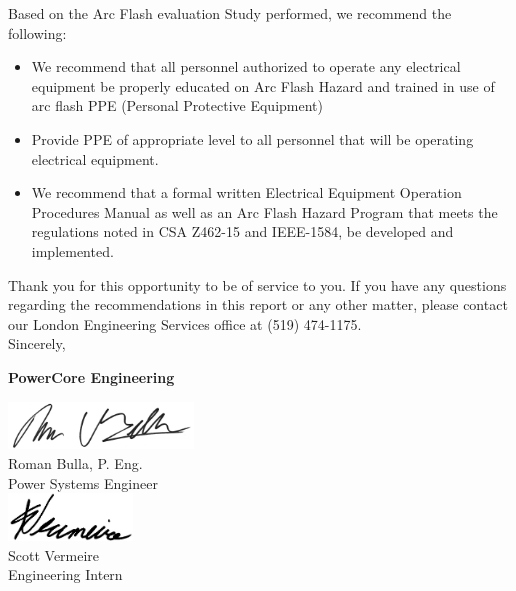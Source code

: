 Based on the Arc Flash evaluation Study performed, we recommend the following:
\begin{itemize}
\item We recommend that all personnel authorized to operate any electrical equipment be properly educated on Arc Flash Hazard and trained  in use of arc flash PPE (Personal Protective Equipment)

\item	Provide PPE of appropriate level to all personnel that will be operating electrical equipment.

\item	We recommend that a formal written Electrical Equipment Operation Procedures Manual as well as an Arc Flash Hazard Program that meets the regulations noted in CSA Z462-15 and IEEE-1584, be developed and implemented.
\end{itemize}
\vspace{10mm}
\noindent Thank you for this opportunity to be of service to you.  If you have any questions regarding the recommendations in this report or any other matter, please contact our London Engineering Services office at (519) 474-1175. \newline
\vspace{5mm}
\\
\noindent Sincerely,\newline

\vspace{5mm}
\noindent\textbf{PowerCore Engineering}\newline


\begin{multicols}{2}
\centering
\includegraphics[height=0.5in, keepaspectratio=true]{Images/Roman_signature.jpg} \\
Roman Bulla, P. Eng. \\Power Systems Engineer \\
\includegraphics[height=0.5in, keepaspectratio=true]{Images/Scott_signature.jpg} \\
Scott Vermeire \\Engineering Intern \\
\end{multicols}